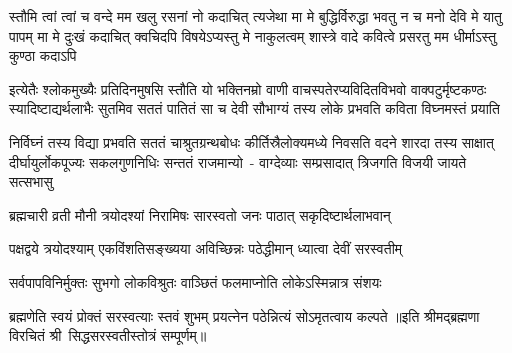 \fourlineindentedshloka
{स्तौमि त्वां त्वां च वन्दे मम खलु रसनां नो कदाचित् त्यजेथा}
{मा मे बुद्धिर्विरुद्धा भवतु न च मनो देवि मे यातु पापम्}
{मा मे दुःखं कदाचित् क्वचिदपि विषयेऽप्यस्तु मे नाकुलत्वम्}
{शास्त्रे वादे कवित्वे प्रसरतु मम धीर्माऽस्तु कुण्ठा कदाऽपि}

\fourlineindentedshloka
{इत्येतैः श्लोकमुख्यैः प्रतिदिनमुषसि स्तौति यो भक्तिनम्रो}
{वाणी वाचस्पतेरप्यविदितविभवो वाक्पटुर्मृष्टकण्ठः}
{स्यादिष्टाद्यर्थलाभैः सुतमिव सततं पातितं सा च देवी}
{सौभाग्यं तस्य लोके प्रभवति कविता विघ्नमस्तं प्रयाति}

\fourlineindentedshloka
{निर्विघ्नं तस्य विद्या प्रभवति सततं चाश्रुतग्रन्थबोधः}
{कीर्तिस्रैलोक्यमध्ये निवसति वदने शारदा तस्य साक्षात्}
{दीर्घायुर्लोकपूज्यः सकलगुणनिधिः सन्ततं राजमान्यो~-}
{वाग्देव्याः सम्प्रसादात् त्रिजगति विजयी जायते सत्सभासु}

\twolineshloka
{ब्रह्मचारी व्रती मौनी त्रयोदश्यां निरामिषः}
{सारस्वतो जनः पाठात् सकृदिष्टार्थलाभवान्}

\twolineshloka
{पक्षद्वये त्रयोदश्याम् एकविंशतिसङ्ख्यया}
{अविच्छिन्नः पठेद्धीमान् ध्यात्वा देवीं सरस्वतीम्}

\twolineshloka
{सर्वपापविनिर्मुक्तः सुभगो लोकविश्रुतः}
{वाञ्छितं फलमाप्नोति लोकेऽस्मिन्नात्र संशयः}

\twolineshloka
{ब्रह्मणेति स्वयं प्रोक्तं सरस्वत्याः स्तवं शुभम्}
{प्रयत्नेन पठेन्नित्यं सोऽमृतत्वाय कल्पते}
॥इति श्रीमद्ब्रह्मणा विरचितं श्री~सिद्धसरस्वतीस्तोत्रं सम्पूर्णम्॥
\setlength{\shlokaspaceskip}{24pt}